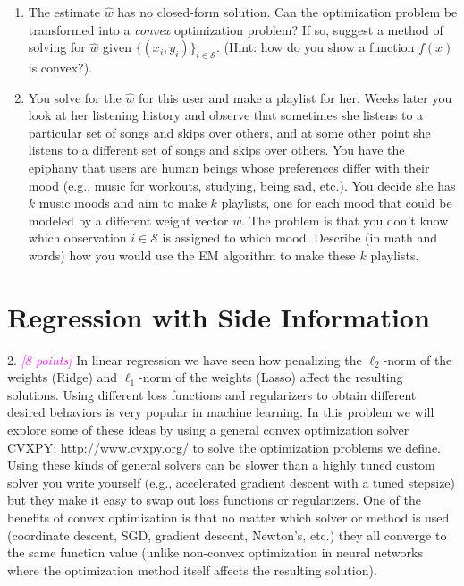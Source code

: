 \documentclass{article}
\newcommand{\1}{\mathbf{1}}
\newcommand{\grade}[1]{\small\textcolor{magenta}{\emph{[#1 points]}} \normalsize}
\begin{document}
\begin{enumerate}
  \item The estimate $\widehat{w}$ has no closed-form solution. Can the optimization problem be transformed into a \emph{convex} optimization problem? If so, suggest a method of solving for $\widehat{w}$ given $\{(x_i,y_i)\}_{i \in \mathcal{S}}$. (Hint: how do you show a function $f(x)$ is convex?).
  \item You solve for the $\widehat{w}$ for this user and make a playlist for her. 
  Weeks later you look at her listening history and observe that sometimes she listens to a particular set of songs and skips over others, and at some other point she listens to a different set of songs and skips over others. 
  You have the epiphany that users are human beings whose preferences differ with their mood (e.g., music for workouts, studying, being sad, etc.).
  You decide she has $k$ music moods and aim to make $k$ playlists, one for each mood that could be modeled by a different weight vector $w$. The problem is that you don't know which observation $i \in \mathcal{S}$ is assigned to which mood. Describe (in math and words) how you would use the EM algorithm to make these $k$ playlists.  
\end{enumerate}


\section*{Regression with Side Information}

2. \grade{8} In linear regression we have seen how penalizing the $\ell_2$-norm of the weights (Ridge) and $\ell_1$-norm of the weights (Lasso) affect the resulting solutions. 
Using different loss functions and regularizers to obtain different desired behaviors is very popular in machine learning. 
In this problem we will explore some of these ideas by using a general convex optimization solver CVXPY: \url{http://www.cvxpy.org/} to solve the optimization problems we define. 
Using these kinds of general solvers can be slower than a highly tuned custom solver you write yourself (e.g., accelerated gradient descent with a tuned stepsize) but they make it easy to swap out loss functions or regularizers. 
One of the benefits of convex optimization is that no matter which solver or method is used (coordinate descent, SGD, gradient descent, Newton's, etc.) they all converge to the same function value (unlike non-convex optimization in neural networks where the optimization method itself affects the resulting solution).\\
\end{document}
